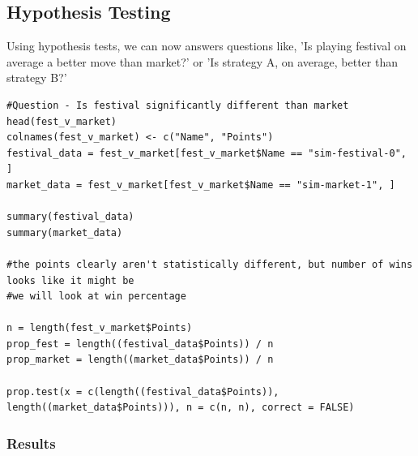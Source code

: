 \documentclass[11pt, oneside]{article}   	%
\begin{document}
\subsection{Hypothesis Testing}

Using hypothesis tests, we can now answers questions like, 'Is playing festival on average a better move than market?' or 'Is strategy A, on average, better than strategy B?'

\begin{verbatim}
#Question - Is festival significantly different than market
head(fest_v_market)
colnames(fest_v_market) <- c("Name", "Points")
festival_data = fest_v_market[fest_v_market$Name == "sim-festival-0", ]
market_data = fest_v_market[fest_v_market$Name == "sim-market-1", ]

summary(festival_data)
summary(market_data)

#the points clearly aren't statistically different, but number of wins looks like it might be
#we will look at win percentage

n = length(fest_v_market$Points)
prop_fest = length((festival_data$Points)) / n
prop_market = length((market_data$Points)) / n

prop.test(x = c(length((festival_data$Points)), length((market_data$Points))), n = c(n, n), correct = FALSE)
\end{verbatim}

\subsubsection{Results}

\begin{figure}[H] \centering
   \begin{minipage}{0.49\textwidth}
   \end{minipage}
   \begin {minipage}{0.49\textwidth}
   \end{minipage}
\end{figure}
\end{document}
